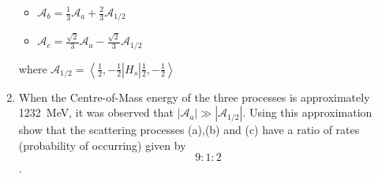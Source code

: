 \begin{enumerate}
\begin{itemize}
\item $\mathcal{A}_b=\frac{1}{3}\mathcal{A}_a+\frac{2}{3}\mathcal{A}_{1/2}$
\item $\mathcal{A}_c=\frac{\sqrt{2}}{3}\mathcal{A}_a-\frac{\sqrt{2}}{3}\mathcal{A}_{1/2}$
\end{itemize}
where $\mathcal{A}_{1/2}=\left<\frac{1}{2},-\frac{1}{2}\right|H_s\left|\frac{1}{2},-\frac{1}{2}\right>$
\item When the Centre-of-Mass energy of the three processes is approximately 1232~MeV, it was observed that $|\mathcal{A}_{a}|\gg|\mathcal{A}_{1/2}|$. Using this approximation show that the scattering processes (a),(b) and (c) have a ratio of rates (probability of occurring) given by \[9:1:2\].
\end{enumerate}
